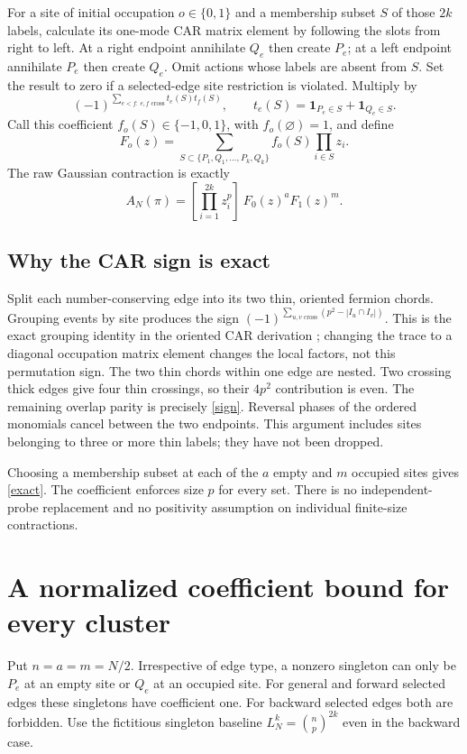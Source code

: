 \documentclass[11pt]{article}
\newcommand{\bn}[2]{\binom{#1}{#2}}
\begin{document}
For a site of initial occupation $o\in\{0,1\}$ and a membership
subset $S$ of those $2k$ labels, calculate its one-mode CAR
matrix element by following the slots from right to left.
At a right endpoint annihilate $Q_e$ then create $P_e$; at a
left endpoint annihilate $P_e$ then create $Q_e$. Omit actions
whose labels are absent from $S$. Set the result to zero if a
selected-edge site restriction is violated. Multiply by
\begin{equation}\label{sign}
 (-1)^{\sum_{e<f:\ e,f\text{ cross}}t_e(S)t_f(S)},
 \qquad t_e(S)=\boldsymbol1_{P_e\in S}+\boldsymbol1_{Q_e\in S}.
\end{equation}
Call this coefficient $f_o(S)\in\{-1,0,1\}$, with $f_o(\varnothing)=1$,
and define
\begin{equation}
 F_o(z)=\sum_{S\subset\{P_1,Q_1,\ldots,P_k,Q_k\}}
               f_o(S)\prod_{i\in S}z_i.
\end{equation}
The raw Gaussian contraction is exactly
\begin{equation}\label{exact}
 A_N(\pi)=[\prod_{i=1}^{2k}z_i^p]\ F_0(z)^a F_1(z)^m.
\end{equation}

\subsection*{Why the CAR sign is exact}
Split each number-conserving edge into its two thin, oriented
fermion chords. Grouping events by site produces the sign
$(-1)^{\sum_{u,v\text{ cross}}(p^2-|I_u\cap I_v|)}$.
This is the exact grouping identity in the oriented CAR derivation
\cite[Eqs.~(3.11)--(3.12)]{BNR}; changing the trace to a diagonal
occupation matrix element changes the local factors, not this
permutation sign. The two thin chords within one edge are nested.
Two crossing thick edges give four thin crossings, so their
$4p^2$ contribution is even. The remaining overlap parity is
precisely \eqref{sign}. Reversal phases of the ordered monomials
cancel between the two endpoints. This argument includes sites
belonging to three or more thin labels; they have not been dropped.

Choosing a membership subset at each of the $a$ empty and $m$
occupied sites gives \eqref{exact}. The coefficient enforces size
$p$ for every set. There is no independent-probe replacement and
no positivity assumption on individual finite-size contractions.

\newpage
\section{A normalized coefficient bound for every cluster}
Put $n=a=m=N/2$. Irrespective of edge type, a nonzero singleton
can only be $P_e$ at an empty site or $Q_e$ at an occupied site.
For general and forward selected edges these singletons have
coefficient one. For backward selected edges both are forbidden.
Use the fictitious singleton baseline $L_N^k=\bn np^{2k}$ even
in the backward case.
\end{document}
